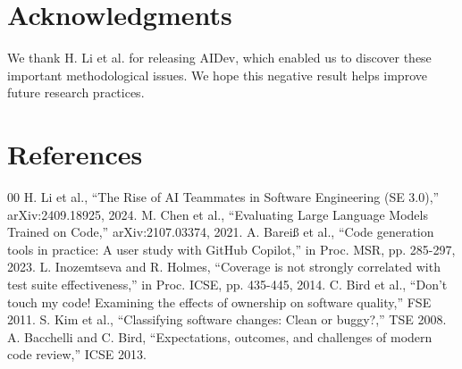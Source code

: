 \documentclass[conference]{IEEEtran}
\begin{document}
\section*{Acknowledgments}
We thank H. Li et al. for releasing AIDev, which enabled us to discover these important methodological issues. We hope this negative result helps improve future research practices.

\section*{References}
\begin{thebibliography}{00}
 H. Li et al., ``The Rise of AI Teammates in Software Engineering (SE 3.0),'' arXiv:2409.18925, 2024.
 M. Chen et al., ``Evaluating Large Language Models Trained on Code,'' arXiv:2107.03374, 2021.
 A. Bareiß et al., ``Code generation tools in practice: A user study with GitHub Copilot,'' in Proc. MSR, pp. 285-297, 2023.
 L. Inozemtseva and R. Holmes, ``Coverage is not strongly correlated with test suite effectiveness,'' in Proc. ICSE, pp. 435-445, 2014.
 C. Bird et al., ``Don't touch my code! Examining the effects of ownership on software quality,'' FSE 2011.
 S. Kim et al., ``Classifying software changes: Clean or buggy?,'' TSE 2008.
 A. Bacchelli and C. Bird, ``Expectations, outcomes, and challenges of modern code review,'' ICSE 2013.
\end{thebibliography}

\balance
\end{document}
